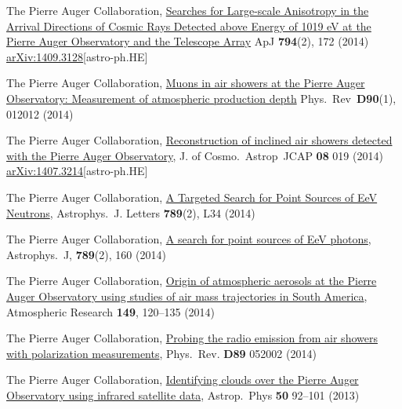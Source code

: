 \begin{etaremune}
\item {}The Pierre Auger Collaboration, \href{http://dx.doi.org/10.1088/0004-637X/794/2/172}{{Searches for Large-scale Anisotropy in the Arrival Directions of Cosmic Rays Detected above Energy of 1019 eV at the Pierre Auger Observatory and the Telescope Array}} ApJ {\textbf{794}}(2), 172 (2014) \href{http://arxiv.org/abs/1409.3128}{arXiv:1409.3128}[astro-ph.HE]

\item {}The Pierre Auger Collaboration, \href{http://journals.aps.org/prd/abstract/10.1103/PhysRevD.90.012012}{{Muons in air showers at the Pierre Auger Observatory: Measurement of atmospheric production depth}} Phys.\ Rev\ {\textbf{D90}}(1), 012012 (2014) %

\item {}The Pierre Auger Collaboration, \href{http://dx.doi.org/10.1088/1475-7516/2014/08/019}{{Reconstruction of inclined air showers detected with the Pierre Auger Observatory}}, J. of Cosmo.\ Astrop\  JCAP {\textbf{08}} 019 (2014) \href{http://arxiv.org/abs/1407.3214}{arXiv:1407.3214}[astro-ph.HE]
  
\item {}The Pierre Auger Collaboration, \href{http://iopscience.iop.org/2041-8205/789/2/L34}{{A Targeted Search for Point Sources of EeV Neutrons}}, Astrophys.\ J. Letters {\textbf{789}}(2), L34 (2014)

\item {}The Pierre Auger Collaboration, \href{http://iopscience.iop.org/0004-637X/789/2/160}{{A search for point sources of EeV photons}}, Astrophys.\ J, {\textbf{789}}(2), 160 (2014)

\item {}The Pierre Auger Collaboration, \href{http://dx.doi.org/10.1016/j.atmosres.2014.05.021}{{Origin of atmospheric aerosols at the Pierre Auger Observatory using studies of air mass trajectories in South America}}, Atmospheric Research {\textbf{149}}, 120--135 (2014)

\item {}The Pierre Auger Collaboration, \href{http://dx.doi.org/10.1103/PhysRevD.89.052002}{{Probing the radio emission from air showers with polarization measurements}}, Phys.\ Rev. {\textbf{D89}} 052002 (2014)

\item {}The Pierre Auger Collaboration, \href{http://dx.doi.org/10.1016/j.astropartphys.2013.09.004}{{Identifying clouds over the Pierre Auger Observatory using infrared satellite data}}, Astrop.\ Phys {\textbf{50}} 92--101 (2013)


\end{etaremune}
